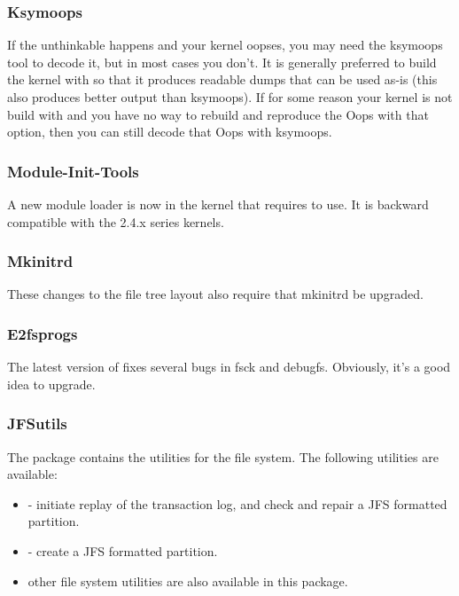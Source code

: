 \documentclass[a4paper,8pt,english]{sphinxmanual}
\begin{document}
\subsubsection{Ksymoops}
\label{process/changes:ksymoops}
If the unthinkable happens and your kernel oopses, you may need the
ksymoops tool to decode it, but in most cases you don't.
It is generally preferred to build the kernel with  so
that it produces readable dumps that can be used as-is (this also
produces better output than ksymoops).  If for some reason your kernel
is not build with  and you have no way to rebuild and
reproduce the Oops with that option, then you can still decode that Oops
with ksymoops.


\subsubsection{Module-Init-Tools}
\label{process/changes:module-init-tools}
A new module loader is now in the kernel that requires 
to use.  It is backward compatible with the 2.4.x series kernels.


\subsubsection{Mkinitrd}
\label{process/changes:mkinitrd}
These changes to the  file tree layout also require that
mkinitrd be upgraded.


\subsubsection{E2fsprogs}
\label{process/changes:e2fsprogs}
The latest version of  fixes several bugs in fsck and
debugfs.  Obviously, it's a good idea to upgrade.


\subsubsection{JFSutils}
\label{process/changes:jfsutils}
The  package contains the utilities for the file system.
The following utilities are available:
\begin{itemize}
\item {} 
 - initiate replay of the transaction log, and check
and repair a JFS formatted partition.

\item {} 
 - create a JFS formatted partition.

\item {} 
other file system utilities are also available in this package.

\end{itemize}
\end{document}
